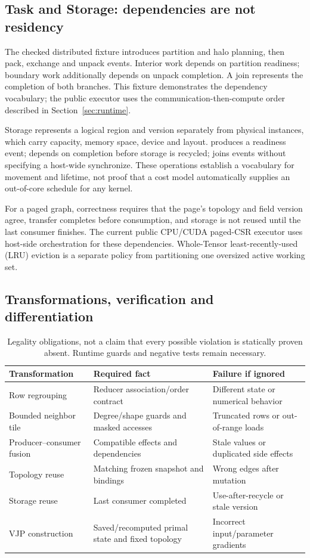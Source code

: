 \subsection{Task and Storage: dependencies are not residency}
The checked distributed fixture introduces partition and halo planning, then
pack, exchange and unpack events. Interior work depends on partition readiness;
boundary work additionally depends on unpack completion. A join represents the
completion of both branches. This fixture demonstrates the dependency vocabulary;
the public executor uses the communication-then-compute order described in
Section~\ref{sec:runtime}.

Storage represents a logical region and version separately from physical
instances, which carry capacity, memory space, device and layout.
 produces a readiness event;
 depends on completion before storage is recycled;
 joins events without specifying a host-wide synchronize.
These operations establish a vocabulary for movement and lifetime, not proof
that a cost model automatically supplies an out-of-core schedule for any kernel.

For a paged graph, correctness requires that the page's topology and field
version agree, transfer completes before consumption, and storage is not reused
until the last consumer finishes. The current public CPU/CUDA paged-CSR executor
uses host-side orchestration for these dependencies. Whole-Tensor
least-recently-used (LRU) eviction is a
separate policy from partitioning one oversized active working set.

\subsection{Transformations, verification and differentiation}
\begin{table}[ht]
\centering\small
\begin{tabularx}{\linewidth}{l Y Y}
\toprule
Transformation & Required fact & Failure if ignored \\
\midrule
Row regrouping & Reducer association/order contract & Different state or numerical behavior \\
Bounded neighbor tile & Degree/shape guards and masked accesses & Truncated rows or out-of-range loads \\
Producer--consumer fusion & Compatible effects and dependencies & Stale values or duplicated side effects \\
Topology reuse & Matching frozen snapshot and bindings & Wrong edges after mutation \\
Storage reuse & Last consumer completed & Use-after-recycle or stale version \\
VJP construction & Saved/recomputed primal state and fixed topology & Incorrect input/parameter gradients \\
\bottomrule
\end{tabularx}
\caption{Legality obligations, not a claim that every possible violation is
statically proven absent. Runtime guards and negative tests remain necessary.}
\end{table}

